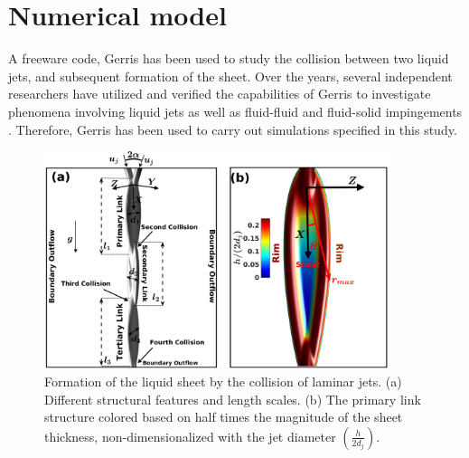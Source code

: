 \section{Numerical model}\label{sec::domainDes}
A freeware code, Gerris \citep{Popinet2003,popinet2009} has been used to study the collision between two liquid jets, and subsequent formation of the sheet. Over the years, several independent researchers have utilized and verified the capabilities of Gerris to investigate phenomena involving liquid jets \citep{Duchemin2002,fuster2013instability,yang2017simulation} as well as fluid-fluid \citep{chen2013high,zhang2017effects} and fluid-solid impingements \citep{visser2015dynamics,jian2018two}. Therefore, Gerris has been used to carry out simulations specified in this study.
\begin{figure}
    \centering
    \includegraphics[width=0.9\textwidth]{chapters/jetJet/Figure1}
    \caption{Formation of the liquid sheet by the collision of laminar jets. (a) Different structural features and length scales. (b) The primary link structure colored based on half times the magnitude of the sheet thickness, non-dimensionalized with the jet diameter $\left(\frac{h}{2d_j}\right)$.}
    \label{Figure::schematic}
\end{figure}
